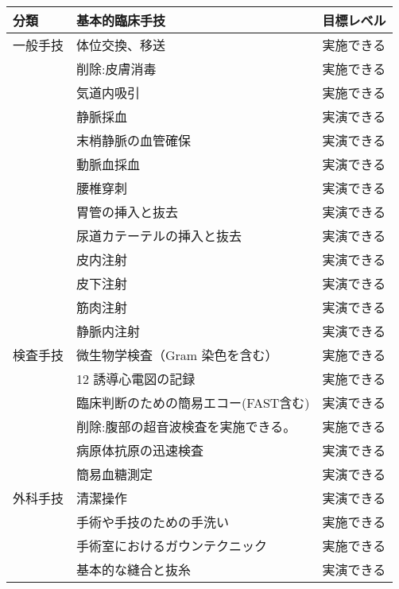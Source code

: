 \begin{xltabular}{\linewidth}{XXX}
\caption{\label{tbl:基本的臨床手技}} \\
\toprule
分類 & 基本的臨床手技 & 目標レベル \\
\midrule
\endhead
一般手技 & 体位交換、移送 & 実施できる \\
 & 削除:皮膚消毒 & 実施できる \\
 & 気道内吸引 & 実施できる \\
 & 静脈採血 & 実演できる \\
 & 末梢静脈の血管確保 & 実演できる \\
 & 動脈血採血 & 実演できる \\
 & 腰椎穿刺 & 実演できる \\
 & 胃管の挿入と抜去 & 実演できる \\
 & 尿道カテーテルの挿入と抜去 & 実演できる \\
 & 皮内注射 & 実演できる \\
 & 皮下注射 & 実演できる \\
 & 筋肉注射 & 実演できる \\
 & 静脈内注射 & 実演できる \\
検査手技 & 微生物学検査（Gram 染色を含む） & 実施できる \\
 & 12 誘導心電図の記録 & 実施できる \\
 & 臨床判断のための簡易エコー(FAST含む) & 実演できる \\
 & 削除:腹部の超音波検査を実施できる。 & 実施できる \\
 & 病原体抗原の迅速検査 & 実演できる \\
 & 簡易血糖測定 & 実演できる \\
外科手技 & 清潔操作 & 実演できる \\
 & 手術や手技のための手洗い & 実施できる \\
 & 手術室におけるガウンテクニック & 実施できる \\
 & 基本的な縫合と抜糸 & 実演できる \\
\bottomrule
\end{xltabular}



